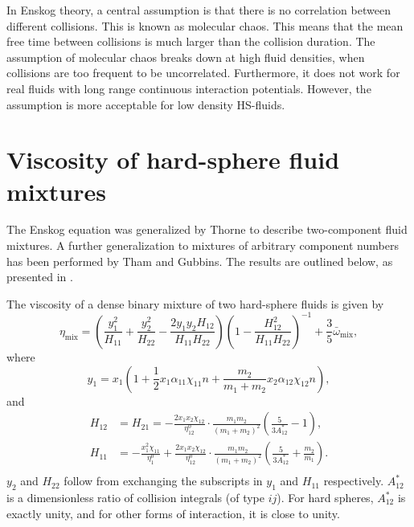 
In Enskog theory, a central assumption is that there is no correlation between different collisions. 
This is known as molecular chaos.
This means that the mean free time between collisions is much larger than the collision duration. 
The assumption of molecular chaos breaks down at high fluid densities, when collisions are too frequent to be uncorrelated.
Furthermore, it does not work for real fluids with long range continuous interaction potentials.
However, the assumption is more acceptable for low density HS-fluids. 


\section{Viscosity of hard-sphere fluid mixtures}
The Enskog equation was generalized by Thorne to describe 
two-component fluid mixtures\cite{ref:chapman:non_uniform_gases}.
A further generalization to mixtures of arbitrary component numbers 
has been performed by Tham and Gubbins\cite{ref:tham:fluid_mixtures}.
The results are outlined below, 
as presented in \cite{ref:pippo:composition_dependence}.

The viscosity of a dense binary mixture of two hard-sphere fluids is given by
\begin{equation}
    \eta_{\text{mix}} 
        = \left(
            \frac{y_1^2}{H_{11}} 
            + \frac{y_2^2}{H_{22}} 
            - \frac{2 y_1 y_2 H_{12}}{H_{11} H_{22}}
        \right)
        \left(
            1 - \frac{H_{12}^2}{H_{11} H_{22}}
        \right)^{-1}
        + \frac{3}{5} \bar{\omega}_{\text{mix}},
\end{equation}
where
\begin{equation}
    \label{eq:viscosity_binary}
    y_1 
        = x_1 \left(
            1   + \frac{1}{2} x_1 \alpha_{11} \chi_{11} n 
                + \frac{m_2}{m_1 + m_2} x_2 \alpha_{12} \chi_{12} n
        \right), 
\end{equation}
and
\begin{equation}
    \begin{split}
        H_{12} &= H_{21}
                =   -\frac{2 x_1 x_2 \chi_{12}}{\eta^0_{12}}
                    \cdot \frac{m_1 m_2}{(m_1 + m_2)^2}
                    \left( \frac{5}{3A^*_{12}} - 1 \right), \\
        H_{11}
                &=  -\frac{x_1^2 \chi_{11}}{\eta^0_1}
                    +\frac{2 x_1 x_2 \chi_{12}}{\eta^0_{12}}
                    \cdot \frac{m_1 m_2}{(m_1 + m_2)^2}
                    \left( \frac{5}{3A^*_{12}} + \frac{m_2}{m_1} \right). \\
    \end{split}
\end{equation}
$y_2$ and $H_{22}$ follow from exchanging the subscripts in $y_1$ and $H_{11}$ 
respectively.
$A^*_{12}$ is a dimensionless ratio of collision integrals (of type ${ij}$).
For hard spheres, $A^*_{12}$ is exactly unity, 
and for other forms of interaction, it is close to unity.

